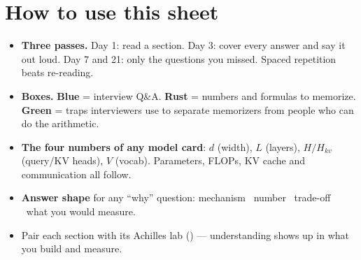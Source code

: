 \thispagestyle{plain}

\section*{How to use this sheet}
\begin{itemize}
\item \textbf{Three passes.} Day 1: read a section. Day 3: cover every answer and say it out loud. Day 7 and 21: only the questions you missed. Spaced repetition beats re-reading.
\item \textbf{Boxes.} {\color{acc}\textbf{Blue}} = interview Q\&A. {\color{acc2}\textbf{Rust}} = numbers and formulas to memorize. {\color{acc3}\textbf{Green}} = traps interviewers use to separate memorizers from people who can do the arithmetic.
\item \textbf{The four numbers of any model card}: $d$ (width), $L$ (layers), $H/H_{kv}$ (query/KV heads), $V$ (vocab). Parameters, FLOPs, KV cache and communication all follow.
\item \textbf{Answer shape} for any ``why'' question: mechanism \ra\ number \ra\ trade-off \ra\ what you would measure.
\item Pair each section with its Achilles lab () --- understanding shows up in what you build and measure.
\end{itemize}

